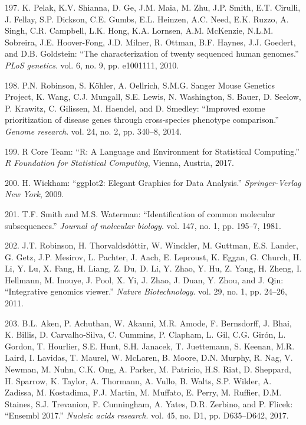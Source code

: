 \documentclass[12pt,a4paper,twoside]{ugathesis}
\theoremstyle{definition}
\theoremstyle{definition}
\theoremstyle{definition}
\theoremstyle{remark}
\begin{document}
\hypertarget{ref-Pelak2010}{}
197. K. Pelak, K.V. Shianna, D. Ge, J.M. Maia, M. Zhu, J.P. Smith, E.T.
Cirulli, J. Fellay, S.P. Dickson, C.E. Gumbs, E.L. Heinzen, A.C. Need,
E.K. Ruzzo, A. Singh, C.R. Campbell, L.K. Hong, K.A. Lornsen, A.M.
McKenzie, N.L.M. Sobreira, J.E. Hoover-Fong, J.D. Milner, R. Ottman,
B.F. Haynes, J.J. Goedert, and D.B. Goldstein: ``The characterization of
twenty sequenced human genomes.'' \emph{PLoS genetics}. vol. 6, no. 9,
pp. e1001111, 2010.

\hypertarget{ref-Robinson2014}{}
198. P.N. Robinson, S. Köhler, A. Oellrich, S.M.G. Sanger Mouse Genetics
Project, K. Wang, C.J. Mungall, S.E. Lewis, N. Washington, S. Bauer, D.
Seelow, P. Krawitz, C. Gilissen, M. Haendel, and D. Smedley: ``Improved
exome prioritization of disease genes through cross-species phenotype
comparison.'' \emph{Genome research}. vol. 24, no. 2, pp. 340--8, 2014.

\hypertarget{ref-RCoreTeam2017}{}
199. R Core Team: ``R: A Language and Environment for Statistical
Computing.'' \emph{R Foundation for Statistical Computing}, Vienna,
Austria, 2017.

\hypertarget{ref-Wickham2009}{}
200. H. Wickham: ``ggplot2: Elegant Graphics for Data Analysis.''
\emph{Springer-Verlag New York}, 2009.

\hypertarget{ref-Smith1981}{}
201. T.F. Smith and M.S. Waterman: ``Identification of common molecular
subsequences.'' \emph{Journal of molecular biology}. vol. 147, no. 1,
pp. 195--7, 1981.

\hypertarget{ref-Robinson2011}{}
202. J.T. Robinson, H. Thorvaldsdóttir, W. Winckler, M. Guttman, E.S.
Lander, G. Getz, J.P. Mesirov, L. Pachter, J. Aach, E. Leproust, K.
Eggan, G. Church, H. Li, Y. Lu, X. Fang, H. Liang, Z. Du, D. Li, Y.
Zhao, Y. Hu, Z. Yang, H. Zheng, I. Hellmann, M. Inouye, J. Pool, X. Yi,
J. Zhao, J. Duan, Y. Zhou, and J. Qin: ``Integrative genomics viewer.''
\emph{Nature Biotechnology}. vol. 29, no. 1, pp. 24--26, 2011.

\hypertarget{ref-Aken2017}{}
203. B.L. Aken, P. Achuthan, W. Akanni, M.R. Amode, F. Bernsdorff, J.
Bhai, K. Billis, D. Carvalho-Silva, C. Cummins, P. Clapham, L. Gil, C.G.
Girón, L. Gordon, T. Hourlier, S.E. Hunt, S.H. Janacek, T. Juettemann,
S. Keenan, M.R. Laird, I. Lavidas, T. Maurel, W. McLaren, B. Moore, D.N.
Murphy, R. Nag, V. Newman, M. Nuhn, C.K. Ong, A. Parker, M. Patricio,
H.S. Riat, D. Sheppard, H. Sparrow, K. Taylor, A. Thormann, A. Vullo, B.
Walts, S.P. Wilder, A. Zadissa, M. Kostadima, F.J. Martin, M. Muffato,
E. Perry, M. Ruffier, D.M. Staines, S.J. Trevanion, F. Cunningham, A.
Yates, D.R. Zerbino, and P. Flicek: ``Ensembl 2017.'' \emph{Nucleic
acids research}. vol. 45, no. D1, pp. D635--D642, 2017.
\end{document}
